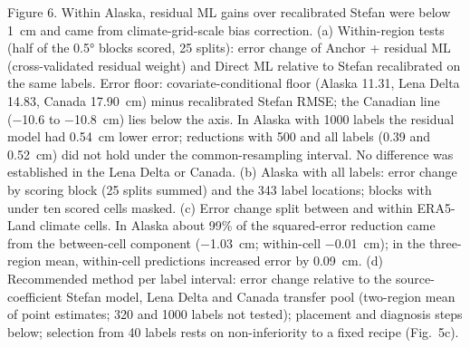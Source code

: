 \medskip

\noindent Figure 6. Within Alaska, residual ML gains over recalibrated Stefan were below 1~cm and came from climate-grid-scale bias correction.
(a) Within-region tests (half of the 0.5° blocks scored, 25 splits): error change of Anchor + residual ML (cross-validated residual weight) and Direct ML relative to Stefan recalibrated on the same labels.
Error floor: covariate-conditional floor (Alaska 11.31, Lena Delta 14.83, Canada 17.90~cm) minus recalibrated Stefan RMSE; the Canadian line (−10.6 to −10.8~cm) lies below the axis.
In Alaska with 1000 labels the residual model had 0.54~cm lower error; reductions with 500 and all labels (0.39 and 0.52~cm) did not hold under the common-resampling interval.
No difference was established in the Lena Delta or Canada.
(b) Alaska with all labels: error change by scoring block (25 splits summed) and the 343 label locations; blocks with under ten scored cells masked.
(c) Error change split between and within ERA5-Land climate cells.
In Alaska about 99\% of the squared-error reduction came from the between-cell component (−1.03~cm; within-cell −0.01~cm); in the three-region mean, within-cell predictions increased error by 0.09~cm.
(d) Recommended method per label interval: error change relative to the source-coefficient Stefan model, Lena Delta and Canada transfer pool (two-region mean of point estimates; 320 and 1000 labels not tested); placement and diagnosis steps below; selection from 40 labels rests on non-inferiority to a fixed recipe (Fig.~5c).
